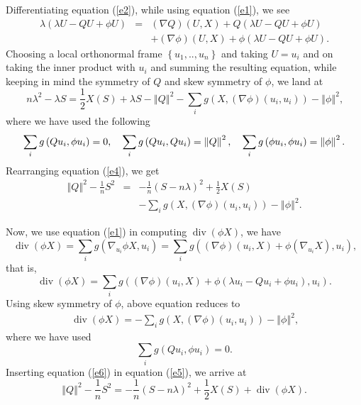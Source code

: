 \documentclass[a4paper, twoside, 10pt]{article}
\numberwithin{equation}{section}
\theoremstyle{definition}
\begin{document}
Differentiating equation (\ref{e2}), while using equation (\ref{e1}), we see
\begin{eqnarray*}
\lambda \left( \lambda U-QU+\phi U\right)  &=&\left( \nabla Q\right) \left(U,X\right) +Q\left( \lambda U-QU+\phi U\right)  \\ 
&&+\left( \nabla \phi \right) \left( U,X\right) +\phi \left( \lambda
U-QU+\phi U\right) \text{.}
\end{eqnarray*}
Choosing a local orthonormal frame $\left\{ u_{1},..,u_{n}\right\} $ and
taking $U=u_{i}$ and on taking the inner product with $u_{i}$ and summing
the resulting equation, while keeping in mind the symmetry of $Q$ and skew
symmetry of $\phi $, we land at
\begin{equation}\label{e4}
n\lambda ^{2}-\lambda S=\frac{1}{2}X(S)+\lambda S-\left\Vert Q\right\Vert
^{2}-\sum\limits_{i}g\left( X,\left( \nabla \phi \right) \left(
u_{i},u_{i}\right) \right) -\left\Vert \phi \right\Vert ^{2}\text{,}  
\end{equation}
where we have used the following
\[
\sum\limits_{i}g\left( Qu_{i},\phi u_{i}\right) =0\text{,\quad }
\sum\limits_{i}g\left( Qu_{i},Qu_{i}\right) =\left\Vert Q\right\Vert ^{2}
\text{,\quad }\sum\limits_{i}g\left( \phi u_{i},\phi u_{i}\right)
=\left\Vert \phi \right\Vert ^{2}\text{.}
\]
Rearranging equation (\ref{e4}), we get%
\begin{eqnarray}\label{e5}
\left\Vert Q\right\Vert ^{2}-\frac{1}{n}S^{2} &=&-\frac{1}{n}\left(
S-n\lambda \right) ^{2}+\frac{1}{2}X(S)   \\
&&-\sum\limits_{i}g\left( X,\left( \nabla \phi \right) \left(
u_{i},u_{i}\right) \right) -\left\Vert \phi \right\Vert ^{2}\text{.} 
\nonumber
\end{eqnarray}

Now, we use equation (\ref{e1}) in computing $\operatorname{div}\left(\phi X\right)$,
we have
\[
\operatorname{div}\left(\phi X \right) =\sum\limits_{i}g\left( \nabla _{u_{i}}\phi
X,u_{i}\right) =\sum\limits_{i}g\left( \left( \nabla \phi \right) \left(
u_{i},X\right) +\phi \left( \nabla _{u_{i}}X\right) ,u_{i}\right) \text{,} 
\]
that is,
\[
\operatorname{div}\left( \phi X\right) =\sum\limits_{i}g\left( \left( \nabla \phi
\right) \left( u_{i},X\right) +\phi \left( \lambda u_{i}-Qu_{i}+\phi
u_{i}\right) ,u_{i}\right) \text{.} 
\]
Using skew symmetry of $\phi $, above equation reduces to
\begin{eqnarray}\label{e6}
\operatorname{div}\left(\phi X \right) = -\sum \limits_{i} g\left(X,\left(\nabla \phi \right) \left( u_{i},u_{i}\right) \right) -\left\Vert \phi \right\Vert
^{2}\text{,}  
\end{eqnarray}
where we have used
\[
\sum\limits_{i}g\left( Qu_{i},\phi u_{i}\right) =0\text{.} 
\]
Inserting equation (\ref{e6}) in equation (\ref{e5}), we arrive at
\begin{equation}\label{e7}
\left\Vert Q\right\Vert ^{2}-\frac{1}{n}S^{2}=-\frac{1}{n}\left( S-n\lambda
\right) ^{2}+\frac{1}{2}X\left( S\right) +\operatorname{div}\left(\phi X \right) 
\text{.}  
\end{equation}
\end{document}
